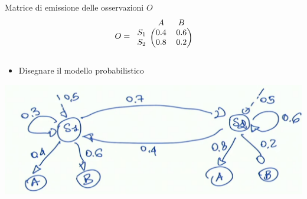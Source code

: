 \documentclass{article}
\begin{document}
Matrice di emissione delle osservazioni  $O$
\[
O = 
\begin{blockarray}{ccc}
		& A & B \\
	\begin{block}{c(cc)}
	S_1 &	0.4  &  0.6   \\
	S_2 &	0.8  &  0.2   \\
	\end{block}
\end{blockarray}
\]	

\begin{itemize}
	\item Disegnare il modello probabilistico
\end{itemize}
	\begin{center}
	\includegraphics[width=14cm]{./immagini/hmm_es2.png}
\end{center}
\end{document}
